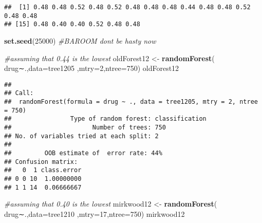 \documentclass[]{article}
\newenvironment{Shaded}{\begin{snugshade}}{\end{snugshade}}
\newcommand{\KeywordTok}[1]{\textcolor[rgb]{0.13,0.29,0.53}{\textbf{#1}}}
\newcommand{\DataTypeTok}[1]{\textcolor[rgb]{0.13,0.29,0.53}{#1}}
\newcommand{\DecValTok}[1]{\textcolor[rgb]{0.00,0.00,0.81}{#1}}
\newcommand{\StringTok}[1]{\textcolor[rgb]{0.31,0.60,0.02}{#1}}
\newcommand{\CommentTok}[1]{\textcolor[rgb]{0.56,0.35,0.01}{\textit{#1}}}
\newcommand{\ControlFlowTok}[1]{\textcolor[rgb]{0.13,0.29,0.53}{\textbf{#1}}}
\newcommand{\OperatorTok}[1]{\textcolor[rgb]{0.81,0.36,0.00}{\textbf{#1}}}
\newcommand{\NormalTok}[1]{#1}
\begin{document}
\begin{Shaded}
\end{Shaded}

\begin{verbatim}
##  [1] 0.48 0.48 0.52 0.48 0.52 0.48 0.48 0.48 0.44 0.48 0.48 0.52 0.48 0.48
## [15] 0.48 0.40 0.40 0.52 0.48 0.48
\end{verbatim}

\begin{Shaded}
\begin{Highlighting}[]
\KeywordTok{set.seed}\NormalTok{(}\DecValTok{25000}\NormalTok{)}
\CommentTok{#BAROOM dont be hasty now}

\CommentTok{#assuming that 0.44 is the lowest}
\NormalTok{oldForest12 <-}\StringTok{ }\KeywordTok{randomForest}\NormalTok{( drug∼.,}\DataTypeTok{data=}\NormalTok{tree1205  ,}\DataTypeTok{mtry=}\DecValTok{2}\NormalTok{,}\DataTypeTok{ntree=}\DecValTok{750}\NormalTok{)}
\NormalTok{oldForest12}
\end{Highlighting}
\end{Shaded}

\begin{verbatim}
## 
## Call:
##  randomForest(formula = drug ~ ., data = tree1205, mtry = 2, ntree = 750) 
##                Type of random forest: classification
##                      Number of trees: 750
## No. of variables tried at each split: 2
## 
##         OOB estimate of  error rate: 44%
## Confusion matrix:
##   0  1 class.error
## 0 0 10  1.00000000
## 1 1 14  0.06666667
\end{verbatim}

\begin{Shaded}
\begin{Highlighting}[]
\CommentTok{#assuming that 0.40 is the lowest}
\NormalTok{mirkwood12 <-}\StringTok{ }\KeywordTok{randomForest}\NormalTok{( drug∼.,}\DataTypeTok{data=}\NormalTok{tree1210  ,}\DataTypeTok{mtry=}\DecValTok{17}\NormalTok{,}\DataTypeTok{ntree=}\DecValTok{750}\NormalTok{)}
\NormalTok{mirkwood12}
\end{Highlighting}
\end{Shaded}
\end{document}

